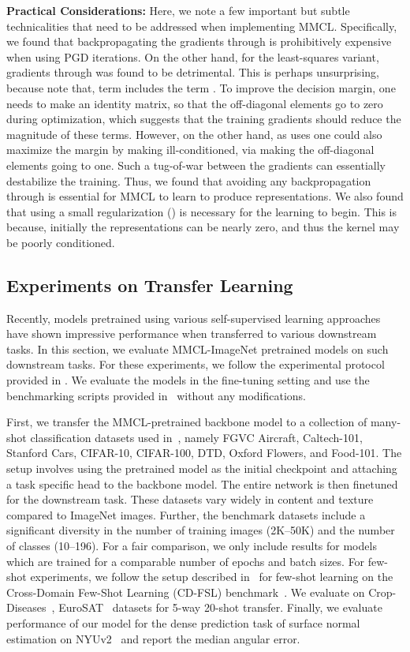 \documentclass[letterpaper]{article} \usepackage{aaai22}  \usepackage{times}  \usepackage{helvet}  \usepackage{courier}  \usepackage[hyphens]{url}  \usepackage{graphicx} \urlstyle{rm} \def\UrlFont{\rm}  \usepackage{natbib}  \usepackage{caption} \DeclareCaptionStyle{ruled}{labelfont=normalfont,labelsep=colon,strut=off} \frenchspacing  \setlength{\pdfpagewidth}{8.5in}  \setlength{\pdfpageheight}{11in}
\begin{document}
\noindent\textbf{Practical Considerations:}
Here, we note a few important but subtle technicalities that need to be addressed when implementing MMCL. Specifically, we found that backpropagating the gradients through  is prohibitively expensive when using PGD iterations. On the other hand, for the least-squares variant, gradients through  was found to be detrimental. This is perhaps unsurprising, because note that,  term includes the term . To improve the decision margin, one needs to make  an identity matrix, so that the off-diagonal elements go to zero during optimization, which suggests that the training gradients should reduce the magnitude of these terms. However, on the other hand, as  uses  one could also maximize the margin by making  ill-conditioned, via making the off-diagonal elements going to one. Such a tug-of-war between the gradients can essentially destabilize the training. Thus, we found that avoiding any backpropagation through  is essential for MMCL to learn to produce representations. We also found that using a small regularization  () is necessary for the learning to begin. This is because, initially the representations can be nearly zero, and thus the kernel may be poorly conditioned.

\subsection{Experiments on Transfer Learning}
Recently, models pretrained using various self-supervised learning approaches have shown impressive performance when transferred to various downstream tasks. In this section, we evaluate MMCL-ImageNet pretrained models on such downstream tasks. For these experiments, we follow the experimental protocol provided in \cite{Ericsson2021HowTransfer}. We evaluate the models in the fine-tuning setting and use the benchmarking scripts provided in~\cite{Ericsson2021HowTransfer} without any modifications. 

First, we transfer the MMCL-pretrained backbone model to a collection of many-shot classification datasets used in~\cite{Ericsson2021HowTransfer}, namely FGVC Aircraft, Caltech-101, Stanford Cars, CIFAR-10, CIFAR-100, DTD, Oxford Flowers, and Food-101. The setup involves using the pretrained model as the initial checkpoint and attaching a task specific head to the backbone model. The entire network is then finetuned for the downstream task. These datasets vary widely in content and texture compared to ImageNet images. Further, the benchmark datasets include a significant diversity in the number of training images (2K--50K) and the number of classes (10--196). For a fair comparison, we only include results for models which are trained for a comparable number of epochs and batch sizes. For few-shot experiments, we follow the setup described in~\cite{Ericsson2021HowTransfer} for few-shot learning on the Cross-Domain Few-Shot Learning (CD-FSL) benchmark~\cite{guo2020broader}. We evaluate on Crop-Diseases~\cite{mohanty2016using}, EuroSAT~\cite{helber2019eurosat} datasets for 5-way 20-shot transfer. Finally, we evaluate performance of our model for the dense prediction task of surface normal estimation on NYUv2~\cite{silberman2012indoor} and report the median angular error. 
\end{document}
